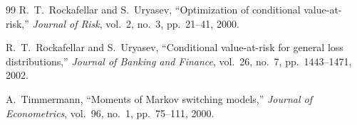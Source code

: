 \begin{thebibliography}{99}
 R.\ T.\ Rockafellar and S.\ Uryasev, ``Optimization of conditional value-at-risk,'' \textit{Journal of Risk}, vol.\ 2, no.\ 3, pp.\ 21--41, 2000.

 R.\ T.\ Rockafellar and S.\ Uryasev, ``Conditional value-at-risk for general loss distributions,'' \textit{Journal of Banking and Finance}, vol.\ 26, no.\ 7, pp.\ 1443--1471, 2002.

 A.\ Timmermann, ``Moments of Markov switching models,'' \textit{Journal of Econometrics}, vol.\ 96, no.\ 1, pp.\ 75--111, 2000.

\end{thebibliography}
